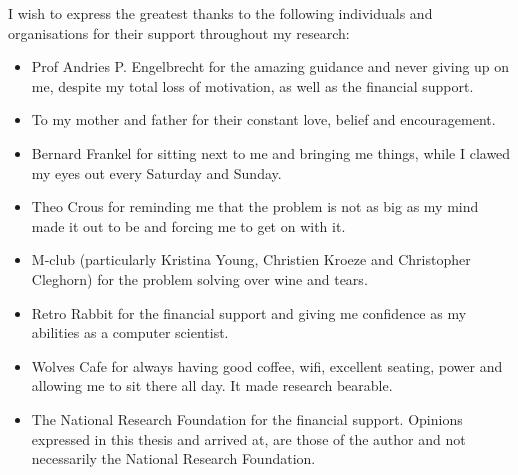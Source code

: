 \noindent I wish to express the greatest thanks to the following individuals and organisations for their support throughout my research:
\begin{itemize}
	\item Prof Andries P. Engelbrecht for the amazing guidance and never giving up on me, despite my total loss of motivation, as well as the financial support.
	\item To my mother and father for their constant love, belief and encouragement.
	\item Bernard Frankel for sitting next to me and bringing me things, while I clawed my eyes out every Saturday and Sunday.
	\item Theo Crous for reminding me that the problem is not as big as my mind made it out to be and forcing me to get on with it.
	\item M-club (particularly Kristina Young, Christien Kroeze and Christopher Cleghorn) for the problem solving over wine and tears.
	\item Retro Rabbit for the financial support and giving me confidence as my abilities as a computer scientist.
	\item Wolves Cafe for always having good coffee, wifi, excellent seating, power and allowing me to sit there all day. It made research bearable.
	\item The National Research Foundation for the financial support. Opinions expressed in this thesis and arrived at, are those of the author and not necessarily the National Research Foundation.
\end{itemize}


\cleardoublepage
\pagestyle{plain}
\setcounter{page}{1}
\ifpdf
{}
\fi
\tableofcontents


\cleardoublepage
\ifpdf
{}
\fi
{}
\listoffigures




\cleardoublepage
\ifpdf
{}
\fi
{}


\cleardoublepage
\ifpdf
{}
\fi
{}
\listoftables

